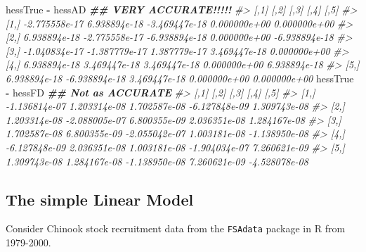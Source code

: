 \documentclass[
]{article}
\newenvironment{Shaded}{\begin{snugshade}}{\end{snugshade}}
\newcommand{\CommentTok}[1]{\textcolor[rgb]{0.56,0.35,0.01}{\textit{#1}}}
\newcommand{\DocumentationTok}[1]{\textcolor[rgb]{0.56,0.35,0.01}{\textbf{\textit{#1}}}}
\newcommand{\FunctionTok}[1]{\textcolor[rgb]{0.13,0.29,0.53}{\textbf{#1}}}
\newcommand{\NormalTok}[1]{#1}
\newcommand{\SpecialCharTok}[1]{\textcolor[rgb]{0.81,0.36,0.00}{\textbf{#1}}}
\begin{document}
\begin{Shaded}
\begin{Highlighting}[]
\NormalTok{  hessTrue }\SpecialCharTok{{-}}\NormalTok{ hessAD }\DocumentationTok{\#\# VERY ACCURATE!!!!!}
\CommentTok{\#\textgreater{}               [,1]          [,2]          [,3]         [,4]          [,5]}
\CommentTok{\#\textgreater{} [1,] {-}2.775558e{-}17  6.938894e{-}18 {-}3.469447e{-}18 0.000000e+00  0.000000e+00}
\CommentTok{\#\textgreater{} [2,]  6.938894e{-}18 {-}2.775558e{-}17 {-}6.938894e{-}18 0.000000e+00 {-}6.938894e{-}18}
\CommentTok{\#\textgreater{} [3,] {-}1.040834e{-}17 {-}1.387779e{-}17  1.387779e{-}17 3.469447e{-}18  0.000000e+00}
\CommentTok{\#\textgreater{} [4,]  6.938894e{-}18  3.469447e{-}18  3.469447e{-}18 0.000000e+00  6.938894e{-}18}
\CommentTok{\#\textgreater{} [5,]  6.938894e{-}18 {-}6.938894e{-}18  3.469447e{-}18 0.000000e+00  0.000000e+00}
\NormalTok{  hessTrue }\SpecialCharTok{{-}}\NormalTok{ hessFD }\DocumentationTok{\#\# Not as ACCURATE}
\CommentTok{\#\textgreater{}               [,1]          [,2]          [,3]          [,4]          [,5]}
\CommentTok{\#\textgreater{} [1,] {-}1.136814e{-}07  1.203314e{-}08  1.702587e{-}08 {-}6.127848e{-}09  1.309743e{-}08}
\CommentTok{\#\textgreater{} [2,]  1.203314e{-}08 {-}2.088005e{-}07  6.800355e{-}09  2.036351e{-}08  1.284167e{-}08}
\CommentTok{\#\textgreater{} [3,]  1.702587e{-}08  6.800355e{-}09 {-}2.055042e{-}07  1.003181e{-}08 {-}1.138950e{-}08}
\CommentTok{\#\textgreater{} [4,] {-}6.127848e{-}09  2.036351e{-}08  1.003181e{-}08 {-}1.904034e{-}07  7.260621e{-}09}
\CommentTok{\#\textgreater{} [5,]  1.309743e{-}08  1.284167e{-}08 {-}1.138950e{-}08  7.260621e{-}09 {-}4.528078e{-}08}
\end{Highlighting}
\end{Shaded}

\hypertarget{the-simple-linear-model}{%
\subsection{The simple Linear Model}\label{the-simple-linear-model}}

Consider Chinook stock recruitment data from the \texttt{FSAdata}
package in R from 1979-2000.

\begin{Shaded}
\end{Shaded}
\end{document}
